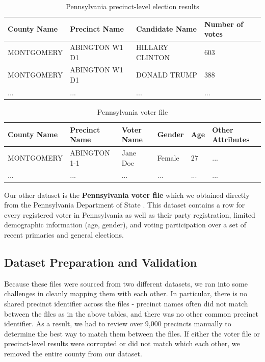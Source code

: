 \documentclass[10pt,twocolumn,letterpaper]{article}
\begin{document}
\begin{table}
\caption{Pennsylvania precinct-level election results}
\begin{center}
\begin{tabular}{ |l|l|l|l| } 
\hline
County Name & Precinct Name & Candidate Name & Number of votes \\
\hline \hline
MONTGOMERY & ABINGTON W1 D1 & HILLARY CLINTON & 603  \\
\hline
MONTGOMERY & ABINGTON W1 D1 & DONALD TRUMP & 388  \\
\hline
... & ...& ... & ...  \\
\hline
\end{tabular}
\end{center}
\end{table}

\begin{table}
\label{tab:datasets}
\caption{Pennsylvania voter file}
\begin{center}
\begin{tabular}{ |l|l|l|l|l|l| } 
\hline
County Name & Precinct Name & Voter Name & Gender & Age & Other Attributes \\
\hline \hline
MONTGOMERY & ABINGTON 1-1 & Jane Doe & Female & 27 & ... \\
\hline
... & ... & ... & ... & ... & ... \\
\hline
\end{tabular}
\end{center}
\end{table}

Our other dataset is the \textbf{Pennsylvania voter file} which we obtained directly from the Pennsylvania Department of State \cite{PAVoterFile}. This dataset contains a row for every registered voter in Pennsylvania as well as their party registration, limited demographic information (age, gender), and voting participation over a set of recent primaries and general elections.

\subsection{Dataset Preparation and Validation}

Because these files were sourced from two different datasets, we ran into some challenges in cleanly mapping them with each other. In particular, there is no shared precinct identifier across the files - precinct names often did not match between the files as in the above tables, and there was no other common precinct identifier. As a result, we had to review over 9,000 precincts manually to determine the best way to match them between the files. If either the voter file or precinct-level results were corrupted or did not match which each other, we removed the entire county from our dataset.
\end{document}
